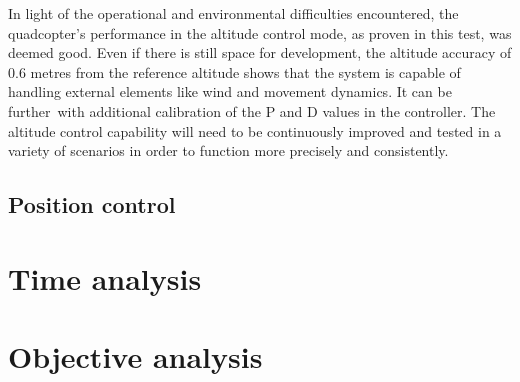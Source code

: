 \documentclass{article}
\begin{document}
In light of the operational and environmental difficulties encountered, the quadcopter's performance in the altitude control mode, as proven in this test, was deemed good. Even if there is still space for development, the altitude accuracy of 0.6 metres from the reference altitude shows that the system is capable of handling external elements 
like wind and movement dynamics. It can be further with additional calibration of the P and D values in the controller. The altitude control capability will need to be continuously improved and tested in a variety of scenarios in order to function more precisely and consistently.

\subsection{Position control}

\section{Time analysis}
\section{Objective analysis}


\end{document}
